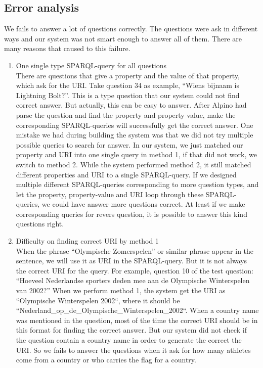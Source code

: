 \documentclass[a4paper,11pt]{article}
\begin{document}
\subsection{Error analysis}
We fails to answer a lot of questions correctly. The questions were ask in different ways and our system was not smart enough to answer all of them. There are many reasons that caused to this failure.

\begin{enumerate}
\item One single type SPARQL-query for all questions \\
There are questions that give a property and the value of that property, which ask for the URI. Take question 34 as example, “Wiens bijnaam is Lightning Bolt?”. This is a type question that our system could not find correct answer. But actually, this can be easy to answer. After Alpino had parse the question and find the property and property value, make the corresponding SPARQL-queries will successfully get the correct answer. One mistake we had during building the system was that we did not try multiple possible queries to search for answer. In our system, we just matched our property and URI into one single query in method 1, if that did not work, we switch to method 2. While the system performed method 2, it still matched different properties and URI to a single SPARQL-query. If we designed multiple different SPARQL-queries corresponding to more question types, and let the property, property-value and URI loop through these SPARQL-queries, we could have answer more questions correct. At least if we make corresponding queries for revers question, it is possible to answer this kind questions right.

\item Difficulty on finding correct URI by method 1 \\
When the phrase “Olympische Zomerspelen” or similar phrase appear in the sentence, we will use it as URI in the SPARQL-query. But it is not always the correct URI for the query. For example, question 10 of the test question: “Hoeveel Nederlandse sporters deden mee aan de Olympische Winterspelen van 2002?” When we perform method 1, the system get the URI as “Olympische Winterspelen 2002“, where it should be “Nederland\_op\_de\_Olympische\_Winterspelen\_2002“. When a country name was mentioned in the question, most of the time the correct URI should be in this format for finding the correct answer. But our system did not check if the question contain a country name in order to generate the correct the URI. So we fails to answer the questions when it ask for how many athletes come from a country or who carries the flag for a country.
\end{enumerate}




\end{document}
